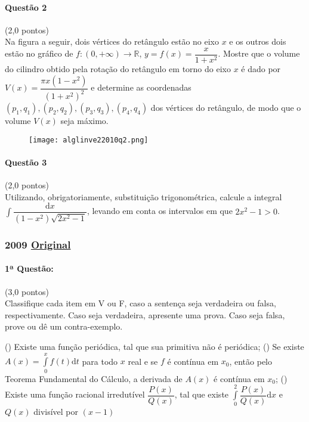 \documentclass[12pt,a4paper]{article}
\newcommand{\R}{\mathbb{R}}
\newcommand{\dd}{\mathrm{d}}
\newcommand{\intdef}[2]{\displaystyle\int\limits_{#1}^{#2}}
\newcommand{\original}[1]{\tiny \href{#1}{Original} \normalsize}
\begin{document}
\paragraph{Questão 2} (2,0 pontos)\\
Na figura a seguir, dois vértices do retângulo estão no eixo $x$ e os outros dois estão no gráfico de $f: (0,+\infty) \to \R$, $y=f(x)=\dfrac{x}{1+x^2}$. Mostre que o volume do cilindro obtido pela rotação do retângulo em torno do eixo $x$ é dado por $V(x) = \dfrac{\pi x(1-x^2)}{(1+x^2)^2}$ e determine as coordenadas $(p_1,q_1),(p_2,q_2),(p_3,q_3),(p_4,q_4)$ dos vértices do retângulo, de modo que o volume $V(x)$ seja máximo.

\begin{figure}[h]
\centering
\texttt{[image: alglinve22010q2.png]}
\end{figure}

\paragraph{Questão 3} (2,0 pontos)\\
Utilizando, obrigatoriamente, substituição trigonométrica, calcule a integral $\displaystyle \int \dfrac{\dd x}{(1-x^2)\sqrt{2x^2-1}}$, levando em conta os intervalos em que $2x^2-1>0$.

\newpage

\subsubsection{2009 \original{https://drive.google.com/open?id=0BzVrEvbC9NPfWV9acjRDTVRKVVk}}

\paragraph{1ª Questão: }(3,0 pontos)\\
Classifique cada item em V ou F, caso a sentença seja verdadeira ou falsa, respectivamente. Caso seja verdadeira, apresente uma prova. Caso seja falsa, prove ou dê um contra-exemplo.
\begin{tasks}
\task (\qquad) Existe uma função periódica, tal que sua primitiva não é periódica;
\task (\qquad) Se existe $A(x) = \intdef{0}{x} f(t)\dd t$ para todo $x$ real e se $f$ é contínua em $x_0$, então pelo Teorema Fundamental do Cálculo, a derivada de $A(x)$ é contínua em  $x_0$;
\task (\qquad) Existe uma função racional irredutível $\dfrac{P(x)}{Q(x)}$, tal que existe $\intdef{0}{2} \dfrac{P(x)}{Q(x)}\dd x$ e $Q(x)$ divisível por $(x-1)$
\end{tasks}
\end{document}
